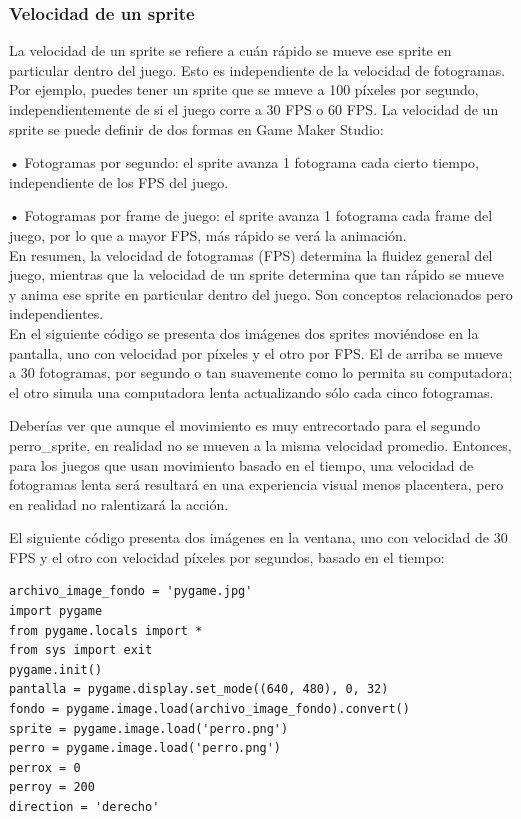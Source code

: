 {\subsubsection*{Velocidad de un sprite}
La velocidad de un sprite se refiere a cuán rápido se mueve ese sprite en particular dentro del juego. Esto es independiente de la velocidad de fotogramas.  Por ejemplo, puedes tener un sprite que se mueve a 100 píxeles por segundo, independientemente de si el juego corre a 30 FPS o 60 FPS.  La velocidad de un sprite se puede definir de dos formas en Game Maker Studio:

• Fotogramas por segundo: el sprite avanza 1 fotograma cada cierto tiempo, independiente de los FPS del juego.

• Fotogramas por frame de juego: el sprite avanza 1 fotograma cada frame del juego, por lo que a mayor FPS, más rápido se verá la animación.\\


En resumen, la velocidad de fotogramas (FPS) determina la fluidez general del juego, mientras que la velocidad de un sprite
determina que tan rápido se mueve y anima ese sprite en particular dentro del juego. Son conceptos relacionados pero independientes.\\


En el siguiente código se presenta dos imágenes dos sprites moviéndose en la pantalla, uno con velocidad por píxeles
y el otro por FPS. El de arriba se mueve a 30 fotogramas, por segundo o tan suavemente como lo permita su computadora; 
el otro simula una computadora lenta actualizando sólo cada cinco fotogramas.

Deberías ver que aunque el movimiento es muy entrecortado para el segundo perro\_sprite, en realidad  no  se mueven a la misma velocidad promedio. Entonces, para los juegos que usan movimiento basado en el tiempo, una velocidad de fotogramas lenta será
resultará en una experiencia visual menos placentera, pero en realidad no ralentizará la acción.

El siguiente código presenta dos imágenes en la ventana, uno con velocidad de 30 FPS y el otro con velocidad  
píxeles  por segundos,  basado en el tiempo:

\hspace{-2.5cm}{\ttfamily \scriptsize compara}

\vspace{-0.2cm}
\hspace{-2.7cm}{\ttfamily \scriptsize \_velocidad.py}\vspace{-0.84cm}
\begin{lstlisting}
archivo_image_fondo = 'pygame.jpg'
import pygame
from pygame.locals import *
from sys import exit
pygame.init()
pantalla = pygame.display.set_mode((640, 480), 0, 32)
fondo = pygame.image.load(archivo_image_fondo).convert()
sprite = pygame.image.load('perro.png')
perro = pygame.image.load('perro.png')
perrox = 0
perroy = 200
direction = 'derecho'


\end{lstlisting}}
